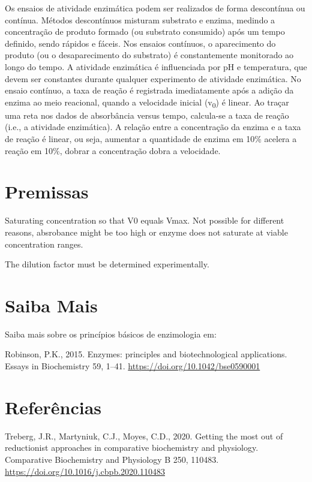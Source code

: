 \documentclass[
  9pt,
  american,
  a5paper,
  extrafontsizes,onecolumn,openright
  ]{memoir}
\begin{document}
Os ensaios de atividade enzimática podem ser realizados de forma descontínua ou contínua. Métodos descontínuos misturam substrato e enzima, medindo a concentração de produto formado (ou substrato consumido) após um tempo definido, sendo rápidos e fáceis. Nos ensaios contínuos, o aparecimento do produto (ou o desaparecimento do substrato) é constantemente monitorado ao longo do tempo. A atividade enzimática é influenciada por pH e temperatura, que devem ser constantes durante qualquer experimento de atividade enzimática. No ensaio contínuo, a taxa de reação é registrada imediatamente após a adição da enzima ao meio reacional, quando a velocidade inicial (v\textsubscript{0}) é linear. Ao traçar uma reta nos dados de absorbância versus tempo, calcula-se a taxa de reação (i.e., a atividade enzimática). A relação entre a concentração da enzima e a taxa de reação é linear, ou seja, aumentar a quantidade de enzima em 10\% acelera a reação em 10\%, dobrar a concentração dobra a velocidade.

\section{Premissas}\label{premissas}

Saturating concentration so that V0 equals Vmax. Not possible for different reasons, absrobance might be too high or enzyme does not saturate at viable concentration ranges.

The dilution factor must be determined experimentally.

\section{Saiba Mais}\label{saiba-mais}

Saiba mais sobre os princípios básicos de enzimologia em:

Robinson, P.K., 2015. Enzymes: principles and biotechnological applications. Essays in Biochemistry 59, 1--41. \url{https://doi.org/10.1042/bse0590001}

\section{Referências}\label{referuxeancias}

Treberg, J.R., Martyniuk, C.J., Moyes, C.D., 2020. Getting the most out of reductionist approaches in comparative biochemistry and physiology. Comparative Biochemistry and Physiology B 250, 110483. \url{https://doi.org/10.1016/j.cbpb.2020.110483}
\end{document}
